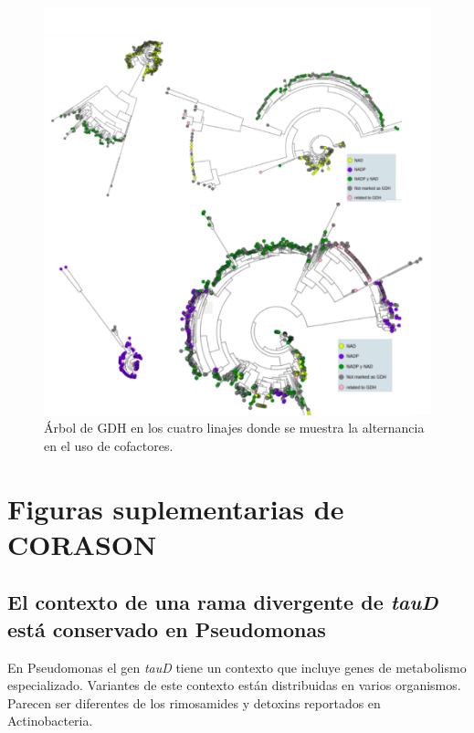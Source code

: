 \documentclass[12pt,twoside]{reedthesis}
\begin{document}
  \begin{figure}[h!tbp]
  \centering
  \includegraphics[angle = 0,scale = .8]{Anexos/GDHFactor.pdf}
  \caption[Árbol de GDH en los cuatro linajes donde se muestra la alternancia en el uso de cofactores.]{\footnotesize{Árbol de GDH en los cuatro linajes donde se muestra la alternancia en el uso de cofactores.}}
  \label{fig:GDHFactor}
  \end{figure}
  
  \section{Figuras suplementarias de
  CORASON}\label{figuras-suplementarias-de-corason}
  
  \subsection{\texorpdfstring{El contexto de una rama divergente de
  \emph{tauD} está conservado en
  Pseudomonas}{El contexto de una rama divergente de tauD está conservado en Pseudomonas}}\label{el-contexto-de-una-rama-divergente-de-taud-esta-conservado-en-pseudomonas}
  
  En Pseudomonas el gen \emph{tauD} tiene un contexto que incluye genes de
  metabolismo especializado. Variantes de este contexto están distribuidas
  en varios organismos. Parecen ser diferentes de los rimosamides y
  detoxins reportados en Actinobacteria.
  
\end{document}

